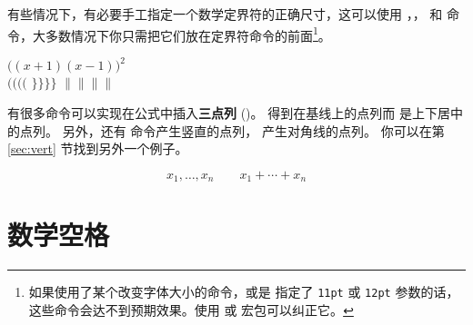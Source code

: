 
有些情况下，有必要手工指定一个数学定界符的正确尺寸，这可以使用 ，， 和
  命令，大多数情况下你只需把它们放在定界符命令的前面\footnote{如果使用了某个改变字体大小的命令，或是
指定了 \texttt{11pt} 或 \texttt{12pt} 参数的话，这些命令会达不到预期效果。使用  或  宏包可以纠正它。}。

\begin{example}
$\Big( (x+1) (x-1) \Big) ^{2}$\\
$\big(\Big(\bigg(\Bigg($\quad
$\big\}\Big\}\bigg\}\Bigg\}$
\quad
$\big\|\Big\|\bigg\|\Bigg\|$
\end{example}



有很多命令可以实现在公式中插入\textbf{三点列} ()。 得到在基线上的点列而  是上下居中的点列。
另外，还有  命令产生竖直的点列， 产生对角线的点列。
你可以在第 \ref{sec:vert} 节找到另外一个例子。
\begin{example}
\begin{displaymath}
x_{1},\ldots,x_{n} \qquad
x_{1}+\cdots+x_{n}
\end{displaymath}
\end{example}

\section{数学空格}

